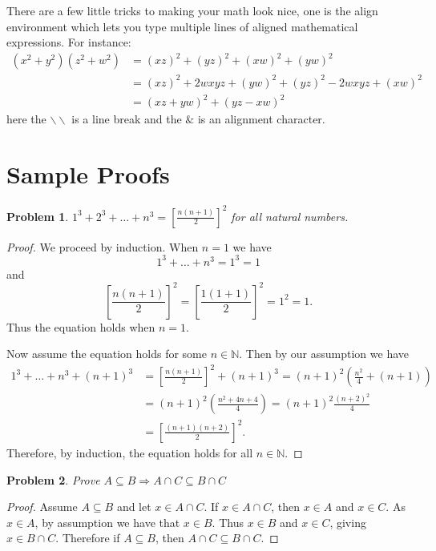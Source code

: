 \documentclass[12pt]{article}
\newcommand{\cont}{\subseteq}
\newtheorem{problem}{Problem}
\theoremstyle{remark}  %
\begin{document}
There are a few little tricks to making your math look nice, one is the align environment which lets you type multiple lines of aligned mathematical expressions. For instance:
\begin{align*}
(x^2+y^2)(z^2+w^2) & = (xz)^2 + (yz)^2 + (xw)^2 + (yw)^2 \\
& =  (xz)^2 + 2wxyz + (yw)^2 + (yz)^2 - 2 wxyz + (xw)^2 \\
&= (xz+yw)^2 + (yz-xw)^2
\end{align*}
here the $\backslash\backslash$ is a line break and the $\&$ is an alignment character. 
\section{Sample Proofs}
\begin{problem} $1^3+2^3+\ldots +n^3 = \left[ \frac{n(n+1)}{2}\right]^2$  for all natural numbers. 

\end{problem}
 
\begin{proof}
We proceed by induction. When $n=1$ we have 
$$
1^3 + \ldots + n^3 = 1^3 =1
$$
and
$$
\left[ \frac{n(n+1)}{2}\right]^2=\left[ \frac{1(1+1)}{2}\right]^2 = 1^2 =1.
$$
Thus the equation holds when $n=1$.

Now assume the equation holds for some $n \in \mathbb N$. Then by our assumption we have
\begin{align*}
1^3 + \ldots + n^3 + (n+1)^3& =   \left[ \frac{n(n+1)}{2}\right]^2 + (n+1)^3 = (n+1)^2\left( \frac{n^2}{4} + (n+1)\right) \\
&=(n+1)^2\left( \frac{n^2+4n+4}{4} \right) = (n+1)^2\frac{(n+2)^2}{4}  \\ &=  \left[ \frac{(n+1)(n+2)}{2}\right]^2.
\end{align*}
Therefore, by induction, the equation holds for all $n\in \mathbb N$.
\end{proof}

\begin{problem} Prove $A \subseteq B \Rightarrow A \cap C \cont B \cap C$
\end{problem}
\begin{proof} Assume $A \cont B $ and let $x\in A \cap C$. If $x \in  A \cap C$, then $x\in A$ and $x \in C$. As $x\in A$, by assumption we have that $x \in B$. Thus $x \in B$ and $x \in C$, giving $x\in B \cap C$. Therefore if $A \subseteq B $, then $A \cap C \cont B \cap C$.
\end{proof}

 
\fi
\end{document}
